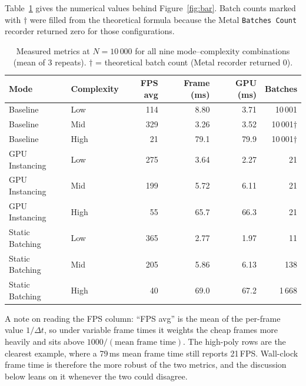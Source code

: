 \documentclass[11pt,a4paper]{article}
\begin{document}
Table~\ref{tab:n10k} gives the numerical values behind Figure~\ref{fig:bar}. Batch
counts marked with $\dagger$ were filled from the theoretical formula because the Metal
\texttt{Batches Count} recorder returned zero for those configurations.

\begin{table}[H]
  \centering
  \caption{Measured metrics at $N=10\,000$ for all nine mode--complexity combinations
    (mean of 3 repeats). $\dagger$ = theoretical batch count (Metal recorder
    returned 0).}
  \label{tab:n10k}
  \begin{tabular}{llrrrr}
    \toprule
    Mode            & Complexity & FPS avg & Frame (ms) & GPU (ms) & Batches          \\
    \midrule
    Baseline        & Low        & 114     & 8.80       & 3.71     & 10\,001          \\
    Baseline        & Mid        & 329     & 3.26       & 3.52     & 10\,001$\dagger$ \\
    Baseline        & High       & 21      & 79.1       & 79.9     & 10\,001$\dagger$ \\
    \midrule
    GPU Instancing  & Low        & 275     & 3.64       & 2.27     & 21               \\
    GPU Instancing  & Mid        & 199     & 5.72       & 6.11     & 21               \\
    GPU Instancing  & High       & 55      & 65.7       & 66.3     & 21               \\
    \midrule
    Static Batching & Low        & 365     & 2.77       & 1.97     & 11               \\
    Static Batching & Mid        & 205     & 5.86       & 6.13     & 138              \\
    Static Batching & High       & 40      & 69.0       & 67.2     & 1\,668           \\
    \bottomrule
  \end{tabular}
\end{table}

A note on reading the FPS column: ``FPS avg'' is the mean of the per-frame value
$1/\Delta t$, so under variable frame times it weights the cheap frames more heavily
and sits above $1000/(\text{mean frame time})$. The high-poly rows are the clearest
example, where a 79\,ms mean frame time still reports 21\,FPS. Wall-clock frame time is
therefore the more robust of the two metrics, and the discussion below leans on it
whenever the two could disagree.
\end{document}
